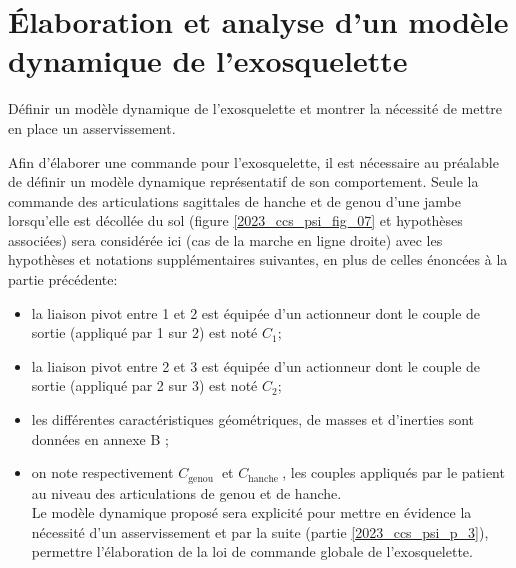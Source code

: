 
\section{Élaboration et analyse d'un modèle dynamique de l'exosquelette\label{2023_ccs_psi_p_2}}
\begin{obj}
Définir un modèle dynamique de l'exosquelette et montrer la nécessité de mettre en place un asservissement.
\end{obj}
\ifprof
\else
Afin d'élaborer une commande pour l'exosquelette, il est nécessaire au préalable de définir un modèle dynamique représentatif de son comportement. Seule la commande des articulations sagittales de hanche et de genou d'une jambe lorsqu'elle est décollée du sol (figure \ref{2023_ccs_psi_fig_07} et hypothèses associées) sera considérée ici (cas de la marche en ligne droite) avec les hypothèses et notations supplémentaires suivantes, en plus de celles énoncées à la partie précédente:

\begin{itemize}
  \item la liaison pivot entre 1 et 2 est équipée d'un actionneur dont le couple de sortie (appliqué par 1 sur 2) est noté $C_{1}$;
  \item la liaison pivot entre 2 et 3 est équipée d'un actionneur dont le couple de sortie (appliqué par 2 sur 3) est noté $C_{2}$;
  \item les différentes caractéristiques géométriques, de masses et d'inerties sont données en annexe B ;
  \item on note respectivement $C_{\text {genou }}$ et $C_{\text {hanche }}$, les couples appliqués par le patient au niveau des articulations de genou et de hanche.\\
Le modèle dynamique proposé sera explicité pour mettre en évidence la nécessité d'un asservissement et par la suite (partie \ref{2023_ccs_psi_p_3}), permettre l'élaboration de la loi de commande globale de l'exosquelette.
\end{itemize}
\fi

